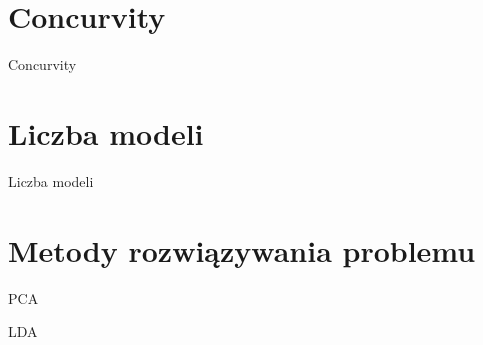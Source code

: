 \documentclass[a4paper]{beamer}
\begin{document}
\section{Concurvity}
\begin{frame}
\begin{block}{Concurvity}

\end{block}
\end{frame}


\section{Liczba modeli}
\begin{frame}
\begin{block}{Liczba modeli}

\end{block}
\end{frame}

\section{Metody rozwiązywania problemu}
\begin{frame}
\begin{block}{PCA}

\end{block}
\begin{block}{LDA}

\end{block}
\end{frame}
\end{document}
